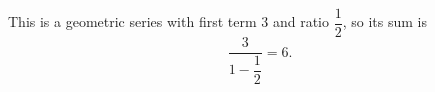This is a geometric series with first term $3$ and ratio $\dfrac{1}{2}$, so its sum is
\[\dfrac{3}{1-\dfrac{1}{2}}=\boxed{6}.\]
